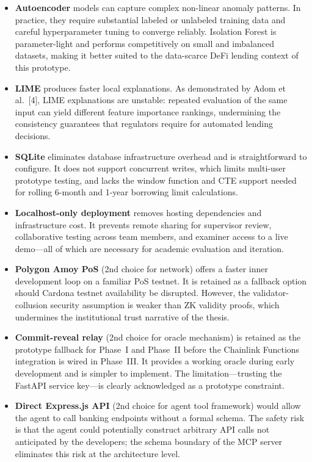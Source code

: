 \documentclass[12pt,a4paper]{report}
\begin{document}
\begin{itemize}[noitemsep]
\item \textbf{Autoencoder} models can capture complex non-linear anomaly patterns. In practice, they require substantial labeled or unlabeled training data and careful hyperparameter tuning to converge reliably. Isolation Forest is parameter-light and performs competitively on small and imbalanced datasets, making it better suited to the data-scarce DeFi lending context of this prototype.

\item \textbf{LIME} produces faster local explanations. As demonstrated by Adom et al.~[4], LIME explanations are unstable: repeated evaluation of the same input can yield different feature importance rankings, undermining the consistency guarantees that regulators require for automated lending decisions.

\item \textbf{SQLite} eliminates database infrastructure overhead and is straightforward to configure. It does not support concurrent writes, which limits multi-user prototype testing, and lacks the window function and CTE support needed for rolling 6-month and 1-year borrowing limit calculations.

\item \textbf{Localhost-only deployment} removes hosting dependencies and infrastructure cost. It prevents remote sharing for supervisor review, collaborative testing across team members, and examiner access to a live demo---all of which are necessary for academic evaluation and iteration.

\item \textbf{Polygon Amoy PoS} (2nd choice for network) offers a faster inner development loop on a familiar PoS testnet. It is retained as a fallback option should Cardona testnet availability be disrupted. However, the validator-collusion security assumption is weaker than ZK validity proofs, which undermines the institutional trust narrative of the thesis.

\item \textbf{Commit-reveal relay} (2nd choice for oracle mechanism) is retained as the prototype fallback for Phase~I and Phase~II before the Chainlink Functions integration is wired in Phase~III. It provides a working oracle during early development and is simpler to implement. The limitation---trusting the FastAPI service key---is clearly acknowledged as a prototype constraint.

\item \textbf{Direct Express.js API} (2nd choice for agent tool framework) would allow the agent to call banking endpoints without a formal schema. The safety risk is that the agent could potentially construct arbitrary API calls not anticipated by the developers; the schema boundary of the MCP server eliminates this risk at the architecture level.


\end{itemize}
\end{document}
